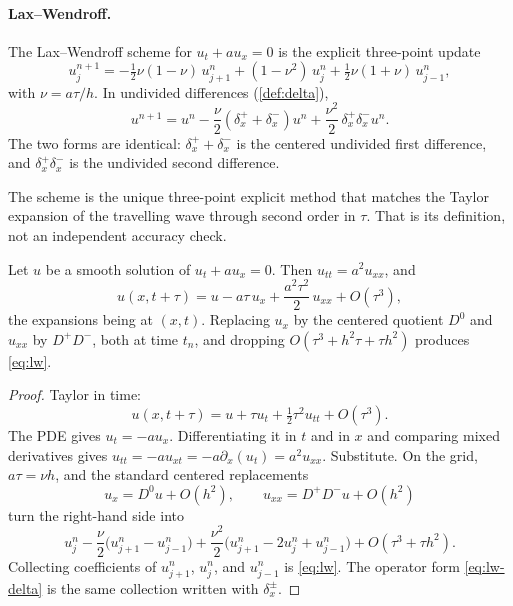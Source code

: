 \paragraph{Lax--Wendroff.}

\begin{definition}
\label{def:lw}
The Lax--Wendroff scheme for \(u_t+a u_x=0\) is the explicit three-point update
\begin{equation}
\label{eq:lw}
u_j^{n+1}
=
-\tfrac12\nu(1-\nu)\,u_{j+1}^n
+
(1-\nu^2)\,u_j^n
+
\tfrac12\nu(1+\nu)\,u_{j-1}^n,
\end{equation}
with \(\nu=a\tau/h\). In undivided differences (\cref{def:delta}),
\begin{equation}
\label{eq:lw-delta}
u^{n+1}
=
u^n
-
\frac{\nu}{2}(\delta_x^++\delta_x^-)u^n
+
\frac{\nu^2}{2}\,\delta_x^+\delta_x^- u^n.
\end{equation}
The two forms are identical: \(\delta_x^++\delta_x^-\) is the centered undivided first difference, and \(\delta_x^+\delta_x^-\) is the undivided second difference.
\end{definition}

The scheme is the unique three-point explicit method that matches the Taylor expansion of the travelling wave through second order in \(\tau\). That is its definition, not an independent accuracy check.

\begin{proposition}
\label{prop:lw-derive}
Let \(u\) be a smooth solution of \(u_t+a u_x=0\). Then \(u_{tt}=a^2 u_{xx}\), and
\[
u(x,t+\tau)
=
u
-
a\tau\, u_x
+
\frac{a^2\tau^2}{2}\,u_{xx}
+
O(\tau^3),
\]
the expansions being at \((x,t)\). Replacing \(u_x\) by the centered quotient \(D^0\) and \(u_{xx}\) by \(D^+D^-\), both at time \(t_n\), and dropping \(O(\tau^3+h^2\tau+\tau h^2)\) produces \eqref{eq:lw}.
\end{proposition}

\begin{proof}
Taylor in time:
\[
u(x,t+\tau)
=
u+\tau u_t+\tfrac12\tau^2 u_{tt}+O(\tau^3).
\]
The PDE gives \(u_t=-a u_x\). Differentiating it in \(t\) and in \(x\) and comparing mixed derivatives gives \(u_{tt}=-a u_{xt}=-a\partial_x(u_t)=a^2 u_{xx}\). Substitute. On the grid, \(a\tau=\nu h\), and the standard centered replacements
\[
u_x
=
D^0 u+O(h^2),
\qquad
u_{xx}
=
D^+D^- u+O(h^2)
\]
turn the right-hand side into
\[
u_j^n
-
\frac{\nu}{2}\bigl(u_{j+1}^n-u_{j-1}^n\bigr)
+
\frac{\nu^2}{2}\bigl(u_{j+1}^n-2u_j^n+u_{j-1}^n\bigr)
+
O(\tau^3+\tau h^2).
\]
Collecting coefficients of \(u_{j+1}^n\), \(u_j^n\), and \(u_{j-1}^n\) is \eqref{eq:lw}. The operator form \eqref{eq:lw-delta} is the same collection written with \(\delta_x^\pm\).
\end{proof}


